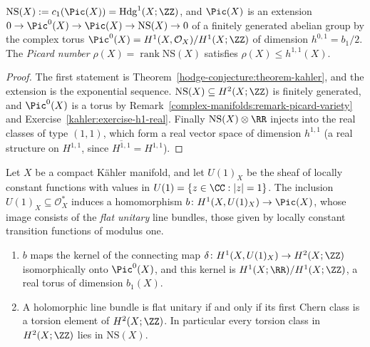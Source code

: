 \begin{corollary}\label{hodge-conjecture:corollary-neron-severi}
$\mathrm{NS}(X) := c_1(\Pic(X)) = \mathrm{Hdg}^1(X; \ZZ)$, and $\Pic(X)$ is an extension $0 \to \Pic^0(X) \to \Pic(X) \to \mathrm{NS}(X) \to 0$ of a finitely generated abelian group by the complex torus
$\Pic^0(X) = H^1(X, \mathcal{O}_X)/H^1(X; \ZZ)$ of dimension $h^{0,1} = b_1/2$. The \emph{Picard number} $\rho(X) = \operatorname{rank}\mathrm{NS}(X)$ satisfies $\rho(X) \leq h^{1,1}(X)$.
\end{corollary}

\begin{proof}
The first statement is Theorem~\ref{hodge-conjecture:theorem-kahler}, and the extension is the exponential sequence. $\mathrm{NS}(X) \subseteq H^2(X; \ZZ)$ is finitely generated, and
$\Pic^0(X)$ is a torus by Remark~\ref{complex-manifolds:remark-picard-variety} and Exercise~\ref{kahler:exercise-h1-real}. Finally $\mathrm{NS}(X) \otimes \RR$ injects into the real
classes of type $(1,1)$, which form a real vector space of dimension $h^{1,1}$ (a real structure on $H^{1,1}$, since $\overline{H^{1,1}} = H^{1,1}$).
\end{proof}

\begin{proposition}\label{hodge-conjecture:proposition-flat}
Let $X$ be a compact K\"ahler manifold, and let $U(1)_X$ be the sheaf of locally constant functions with values in $U(1) = \{z \in \CC : |z| = 1\}$. The inclusion $U(1)_X \subseteq \mathcal{O}_X^*$ induces a
homomorphism $b \colon H^1(X, U(1)_X) \to \Pic(X)$, whose image consists of the \emph{flat unitary} line bundles, those given by locally constant transition functions of modulus one.
\begin{enumerate}
\item $b$ maps the kernel of the connecting map $\delta \colon H^1(X, U(1)_X) \to H^2(X; \ZZ)$ isomorphically onto $\Pic^0(X)$, and this kernel is $H^1(X; \RR)/H^1(X; \ZZ)$, a real torus of dimension $b_1(X)$.
\item A holomorphic line bundle is flat unitary if and only if its first Chern class is a torsion element of $H^2(X; \ZZ)$. In particular every torsion class in $H^2(X; \ZZ)$ lies in $\mathrm{NS}(X)$.
\end{enumerate}
\end{proposition}

